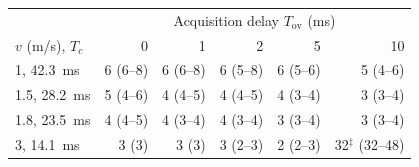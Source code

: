 \begin{tabular}{lrrrrr}
\toprule
& \multicolumn{5}{c}{Acquisition delay $T_{\mathrm{ov}}$ (ms)} \\
$v$ (m/s), $T_c$ & 0 & 1 & 2 & 5 & 10 \\
\midrule
1, 42.3~ms & 6 (6--8) & 6 (6--8) & 6 (5--8) & 6 (5--6) & 5 (4--6) \\
1.5, 28.2~ms & 5 (4--6) & 4 (4--5) & 4 (4--5) & 4 (3--4) & 3 (3--4) \\
1.8, 23.5~ms & 4 (4--5) & 4 (3--4) & 4 (3--4) & 3 (3--4) & 3 (3--4) \\
3, 14.1~ms & 3 (3) & 3 (3) & 3 (2--3) & 2 (2--3) & 32$^\ddagger$ (32--48) \\
\bottomrule
\end{tabular}
